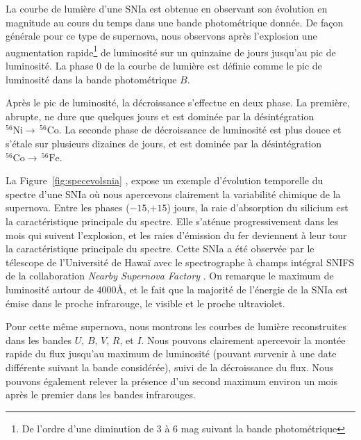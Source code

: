 \documentclass[../main/main.tex]{subfiles}
\begin{document}
La courbe de lumière d'une SNIa est obtenue en observant son évolution en magnitude au cours du temps
dans une bande photométrique donnée. De façon générale pour ce type de
supernova, nous observons après l'explosion une augmentation rapide\footnote{De
l'ordre d'une diminution de $3$ à $6$ mag suivant la bande photométrique} de
luminosité sur un quinzaine de jours jusqu'au pic de
luminosité. La phase $0$ de la courbe de lumière est définie comme le
pic de luminosité dans la bande photométrique $B$.

Après le pic de luminosité, la décroissance s'effectue en deux phase. La
première, abrupte, ne dure que quelques jours et est dominée par la
désintégration $^{56}\text{Ni}\rightarrow \, ^{56}\text{Co}$. La seconde
phase de décroissance de luminosité est plus douce et s'étale sur
plusieurs dizaines de jours, et est dominée par la désintégration
$^{56}\text{Co}\rightarrow \, ^{56}\text{Fe}$.

La Figure~\ref{fig:specevolsnia} \citep[extraite de][]{Pereira2013}, expose un exemple d'évolution temporelle du spectre
d'une SNIa \citep[SN2011fe, découverte par][]{Nugent2011} où nous
apercevons clairement la variabilité chimique de la supernova. Entre les
phases ($-15$,$+15$) jours, la
raie d'absorption du silicium est la caractéristique principale du
spectre. Elle s'aténue progressivement dans les mois qui suivent
l'explosion, et les raies d'émission du fer deviennent à leur tour la caractéristique
principale du spectre. Cette
SNIa a été observée par le télescope de l'Université de Hawaï avec le
spectrographe à champs intégral SNIFS \citep[SuperNova Integrated Field
Spectrograph][]{SNIFS2004} de la collaboration \textit{Nearby Supernova
  Factory} \citep{Aldering2002}.
On remarque le maximum de luminosité autour de $4000$\AA, et le
fait que la majorité de l'énergie de la SNIa est émise dans le proche
infrarouge, le visible et le proche ultraviolet. 

Pour cette même supernova, nous montrons les courbes de lumière
reconstruites dans les bandes $U$, $B$, $V$, $R$, et $I$. Nous pouvons
clairement apercevoir la montée rapide du flux jusqu'au maximum de
luminosité (pouvant survenir à une date différente suivant la bande
considérée), suivi de la décroissance du flux. Nous pouvons également
relever la présence d'un second maximum environ un mois après le premier
dans les bandes infrarouges.
\end{document}
